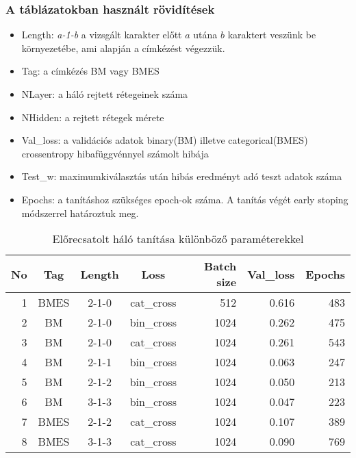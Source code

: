 \documentclass[a4paper, magyar]{article}
\begin{document}
\subsubsection{A táblázatokban használt rövidítések}
\begin{itemize}
	\item Length: \textit{a-1-b} a vizsgált karakter előtt $a$ utána $b$ karaktert veszünk be környezetébe, ami alapján a címkézést végezzük.
	\item Tag: a címkézés BM vagy BMES
	\item NLayer: a háló rejtett rétegeinek száma
	\item NHidden: a rejtett rétegek mérete
	\item Val\_loss: a validációs adatok binary(BM) illetve categorical(BMES) crossentropy hibafüggvénnyel számolt hibája
	\item Test\_w: maximumkiválasztás után hibás eredményt adó teszt adatok száma
	\item Epochs: a tanításhoz szükséges epoch-ok száma. A tanítás végét early stoping módszerrel határoztuk meg.
\end{itemize}
\begin{table}[htp]\centering
	\begin{tabular}{|r|c|c|c|r|r|r|}
		\hline
		No&Tag&Length&Loss&Batch size&Val\_loss&Epochs\\
		\hline
		1&BMES&2-1-0&cat\_cross&512&0.616&483\\ 
		\hline
		2&BM&2-1-0&bin\_cross&1024&0.262&475\\
		\hline
		3&BM&2-1-0&cat\_cross&1024&0.261&543\\
		\hline
		4&BM&2-1-1&bin\_cross&1024&0.063&247\\
		\hline
		5&BM&2-1-2&bin\_cross&1024&0.050&213\\
		\hline
		6&BM&3-1-3&bin\_cross&1024&0.047&223\\
		\hline
		7&BMES&2-1-2&cat\_cross&1024&0.107&389\\
		\hline
		8&BMES&3-1-3&cat\_cross&1024&0.090&769\\
		\hline
	\end{tabular}
	\caption{Előrecsatolt háló tanítása különböző paraméterekkel}
	\label{tab:firstlearn}
\end{table}
\end{document}
